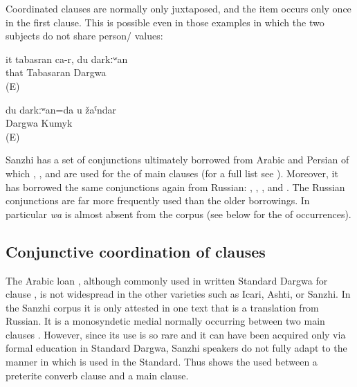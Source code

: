 Coordinated  clauses are normally only juxtaposed, and the  item occurs only once in the first clause. This is possible even in those examples in which the two  subjects do not share person/ values:

\begin{exe}
	\ex	\label{ex:‎‎She is Tabasaran, I (am) Dargwa}
	\gll	it	tabasran	ca-r,		du	darkːʷan\\
		that	Tabasaran			Dargwa\\
	\glt	{} (E)

	\ex	\label{ex:‎‎I am Dargwa, you (are) Kumyk}
	\gll	du	darkːʷan=da		u	žaˁndar\\
			Dargwa			Kumyk\\
	\glt	{} (E)
\end{exe}

Sanzhi has a set of conjunctions ultimately borrowed from Arabic and Persian of which  ,  , and   are used for the  of main clauses (for a full list see ). Moreover, it has borrowed the same conjunctions again from Russian:  ,  ,  , and  . The Russian conjunctions are far more frequently used than the older borrowings. In particular \textit{wa} is almost absent from the corpus (see below for the  of occurrences).



\subsection{Conjunctive coordination of clauses}
\label{ssec:Conjunctive coordination of clauses}

The Arabic loan , although commonly used in written Standard Dargwa for clause  \citep{vandenBerg2004}, is not widespread in the other varieties such as Icari, Ashti, or Sanzhi. In the Sanzhi corpus it is only attested in one text that is a translation from Russian. It is a monosyndetic medial  normally occurring between two main clauses . However, since its use is so rare and it can have been acquired only via formal education in Standard Dargwa, Sanzhi speakers do not fully adapt to the manner in which  is used in the Standard. Thus  shows the  used between a preterite converb clause and a main clause.

